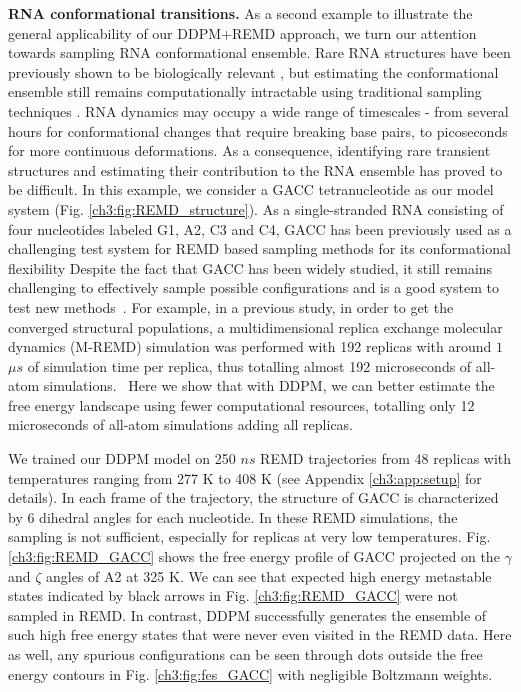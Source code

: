 \textbf{RNA conformational transitions.}
As a second example to illustrate the general applicability of our DDPM+REMD approach, we turn our attention towards sampling RNA conformational ensemble. Rare RNA structures have been previously shown to be biologically relevant \cite{Bannwarth2005, SchulzeGahmen2018, Ganser2019}, but estimating the conformational ensemble still remains computationally intractable using traditional sampling techniques \cite{Sponer2018}. RNA dynamics may occupy a wide range of timescales - from several hours for conformational changes that require breaking base pairs, to picoseconds for more continuous deformations. \cite{Ganser2019} As a consequence, identifying rare transient structures and estimating their contribution to the RNA ensemble has proved to be difficult.
In this example, we consider a GACC tetranucleotide as our model system (Fig. \ref{ch3:fig:REMD_structure}). As a single-stranded RNA consisting of four nucleotides labeled G1, A2, C3 and C4, GACC has been previously used as a challenging test system for REMD based sampling methods for its conformational flexibility \cite{long_REMD_GACC}
Despite the fact that GACC has been widely studied, it still remains challenging to effectively sample possible configurations and is a good system to test new methods~\cite{Sponer2018}. For example, in a previous study, in order to get the converged structural populations, a multidimensional replica exchange molecular dynamics (M-REMD) simulation was performed with 192 replicas with around $1$ $\mu s$ of simulation time per replica, thus totalling almost 192 microseconds of all-atom simulations.~\cite{long_REMD_GACC} Here we show that with DDPM, we can better estimate the free energy landscape using fewer computational resources, totalling only 12 microseconds of all-atom simulations adding all replicas.

We trained our DDPM model on 250 $ns$ REMD trajectories from 48 replicas with temperatures ranging from 277 K to 408 K (see Appendix \ref{ch3:app:setup} for details). In each frame of the trajectory, the structure of GACC is characterized by 6 dihedral angles for each nucleotide. In these REMD simulations, the sampling is not sufficient, especially for replicas at very low temperatures. Fig. \ref{ch3:fig:REMD_GACC} shows the free energy profile of GACC projected on the $\gamma$ and $\zeta$ angles of A2 at 325 K. We can see that expected high energy metastable states indicated by black arrows in Fig. \ref{ch3:fig:REMD_GACC} were not sampled in REMD. In contrast, DDPM successfully generates the ensemble of such high free energy states that were never even visited in the REMD data. Here as well, any spurious configurations can be seen through dots outside the free energy contours in Fig. \ref{ch3:fig:fes_GACC} with negligible Boltzmann weights.

